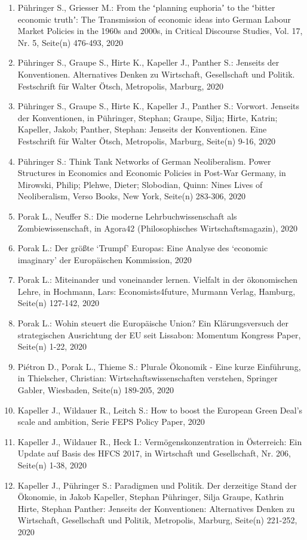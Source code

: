 \begin{enumerate}
	 \item Pühringer S., Griesser M.: From the ʻplanning euphoriaʼ to the ʻbitter economic truthʼ: The Transmission of economic ideas into German Labour Market Policies in the 1960s and 2000s, in Critical Discourse Studies, Vol. 17, Nr. 5, Seite(n) 476-493, 2020
	 \item Pühringer S., Graupe S., Hirte K., Kapeller J., Panther S.: Jenseits der Konventionen. Alternatives Denken zu Wirtschaft, Gesellschaft und Politik. Festschrift für Walter Ötsch, Metropolis, Marburg, 2020
	 \item Pühringer S., Graupe S., Hirte K., Kapeller J., Panther S.: Vorwort. Jenseits der Konventionen, in Pühringer, Stephan; Graupe, Silja; Hirte, Katrin; Kapeller, Jakob; Panther, Stephan: Jenseits der Konventionen. Eine Festschrift für Walter Ötsch, Metropolis, Marburg, Seite(n) 9-16, 2020
	 \item Pühringer S.: Think Tank Networks of German Neoliberalism. Power Structures in Economics and Economic Policies in Post-War Germany, in Mirowski, Philip; Plehwe, Dieter; Slobodian, Quinn: Nines Lives of Neoliberalism, Verso Books, New York, Seite(n) 283-306, 2020
	 \item Porak L., Neuffer S.: Die moderne Lehrbuchwissenschaft als Zombiewissenschaft, in Agora42 (Philosophisches Wirtschaftsmagazin), 2020
	 \item Porak L.: Der größte ‘Trumpf’ Europas: Eine Analyse des ‘economic imaginary’ der Europäischen Kommission, 2020
	 \item Porak L.: Miteinander und voneinander lernen. Vielfalt in der ökonomischen Lehre, in Hochmann, Lars: Economists4future, Murmann Verlag, Hamburg, Seite(n) 127-142, 2020
	 \item Porak L.: Wohin steuert die Europäische Union? Ein Klärungsversuch der strategischen Ausrichtung der EU seit Lissabon: Momentum Kongress Paper, Seite(n) 1-22, 2020
	 \item Piétron D., Porak L., Thieme S.: Plurale Ökonomik - Eine kurze Einführung, in Thielscher, Christian: Wirtschaftswissenschaften verstehen, Springer Gabler, Wiesbaden, Seite(n) 189-205, 2020
	 \item Kapeller J., Wildauer R., Leitch S.: How to boost the European Green Deal’s scale and ambition, Serie FEPS Policy Paper, 2020
	 \item Kapeller J., Wildauer R., Heck I.: Vermögenskonzentration in Österreich: Ein Update auf Basis des HFCS 2017, in Wirtschaft und Gesellschaft, Nr. 206, Seite(n) 1-38, 2020
	 \item Kapeller J., Pühringer S.: Paradigmen und Politik. Der derzeitige Stand der Ökonomie, in Jakob Kapeller, Stephan Pühringer, Silja Graupe, Kathrin Hirte, Stephan Panther: Jenseits der Konventionen: Alternatives Denken zu Wirtschaft, Gesellschaft und Politik, Metropolis, Marburg, Seite(n) 221-252, 2020

\end{enumerate}
